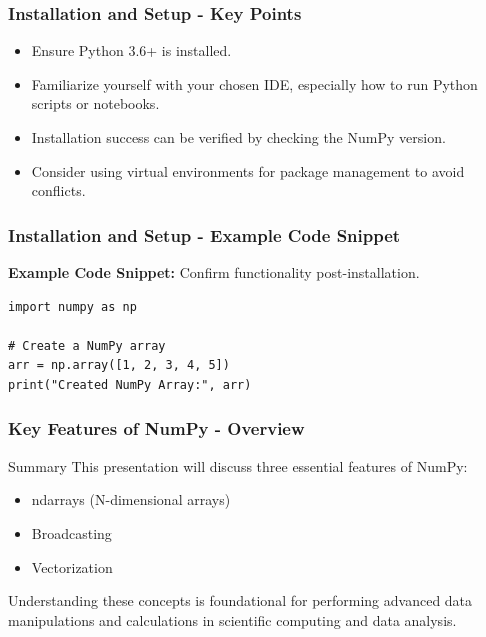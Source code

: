 \documentclass{beamer}
\begin{document}
\begin{frame}[fragile]
    \frametitle{Installation and Setup - Key Points}
    \begin{itemize}
        \item Ensure Python 3.6+ is installed.
        \item Familiarize yourself with your chosen IDE, especially how to run Python scripts or notebooks.
        \item Installation success can be verified by checking the NumPy version.
        \item Consider using virtual environments for package management to avoid conflicts.
    \end{itemize}
\end{frame}

\begin{frame}[fragile]
    \frametitle{Installation and Setup - Example Code Snippet}
    \textbf{Example Code Snippet:} Confirm functionality post-installation.
    \begin{lstlisting}
import numpy as np

# Create a NumPy array
arr = np.array([1, 2, 3, 4, 5])
print("Created NumPy Array:", arr)
    \end{lstlisting}
\end{frame}

\begin{frame}[fragile]
    \frametitle{Key Features of NumPy - Overview}
    \begin{block}{Summary}
        This presentation will discuss three essential features of NumPy:
        \begin{itemize}
            \item ndarrays (N-dimensional arrays)
            \item Broadcasting
            \item Vectorization
        \end{itemize}
        Understanding these concepts is foundational for performing advanced data manipulations and calculations in scientific computing and data analysis.
    \end{block}
\end{frame}
\end{document}
